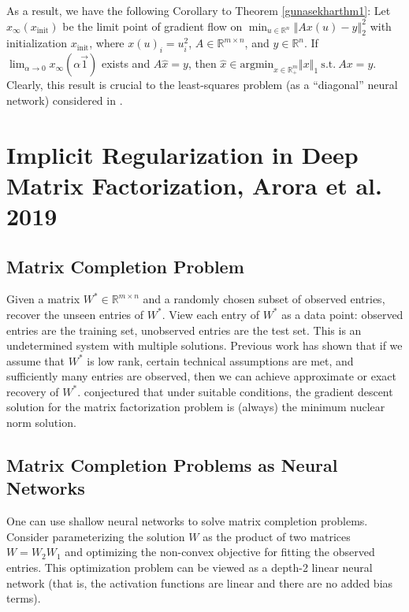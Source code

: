 \documentclass{article}
\newenvironment{manualcorollary}[1]{%
  \renewcommand\themanualcorollaryinner{#1}%
  \manualcorollaryinner
}{\endmanualcorollaryinner}
\begin{document}
As a result, we have the following Corollary to Theorem \ref{gunasekharthm1}:
\begin{manualcorollary}{2}\label{gunasekharcor2}
Let $x_{\infty}(x_{\text{init}})$ be the limit point of gradient flow on $\min_{u \in \mathbb{R}^n} \left\Vert A x(u) - y\right\Vert_2^2$ with initialization $x_{\text{init}}$, where $x(u)_i = u_i^2$, $A \in \mathbb{R}^{m \times n}$, and $y \in \mathbb{R}^n$. If $\lim_{\alpha \rightarrow 0}x_{\infty}(\alpha \vec{1})$ exists and $A\widehat{x}=y$, then
$\widehat{x} \in \text{argmin}_{x \in \mathbb{R}_+^m} \left\Vert x\right\Vert_1 \ \text{s.t.} \ Ax = y.$
\end{manualcorollary}
Clearly, this result is crucial to the least-squares problem (as a \enquote{diagonal} neural network) considered in \cite{woodworth2020kernel}.

\section{Implicit Regularization in Deep Matrix Factorization, Arora et al. 2019}
\subsection{Matrix Completion Problem}
Given a matrix $W^* \in \mathbb{R}^{m \times n}$ and a randomly chosen subset of observed entries, recover the unseen entries of $W^*$. View each entry of $W^*$ as a data point: observed entries are the training set, unobserved entries are the test set. This is an undetermined system with multiple solutions. Previous work has shown that if we assume that $W^*$ is low rank, certain technical assumptions are met, and sufficiently many entries are observed, then we can achieve approximate or exact recovery of $W^*$. \cite{gunasekar2018implicit} conjectured that under suitable conditions, the gradient descent solution for the matrix factorization problem is (always) the minimum nuclear norm solution.

\subsection{Matrix Completion Problems as Neural Networks}
One can use shallow neural networks to solve matrix completion problems. Consider parameterizing the solution $W$ as the product of two matrices $W = W_2 W_1$ and optimizing the non-convex objective for fitting the observed entries. This optimization problem can be viewed as a depth-2 linear neural network (that is, the activation functions are linear and there are no added bias terms).
\end{document}
